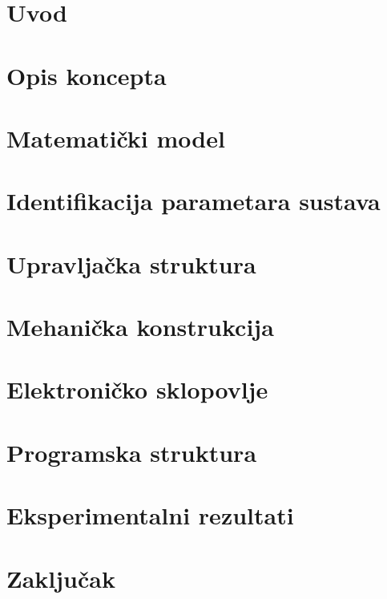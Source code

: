 \documentclass[11pt,a4paper]{article}
\begin{document}
\section{Uvod}


\newpage
\section{Opis koncepta} 


\newpage
\section{Matematički model}


\newpage
\section{Identifikacija parametara sustava}


\newpage
\section{Upravljačka struktura}


\newpage
\section{Mehanička konstrukcija}


\newpage
\section{Elektroničko sklopovlje}


\newpage
\section{Programska struktura}


\newpage
\section{Eksperimentalni rezultati}



\newpage
\section{Zaključak} 

\end{document}
